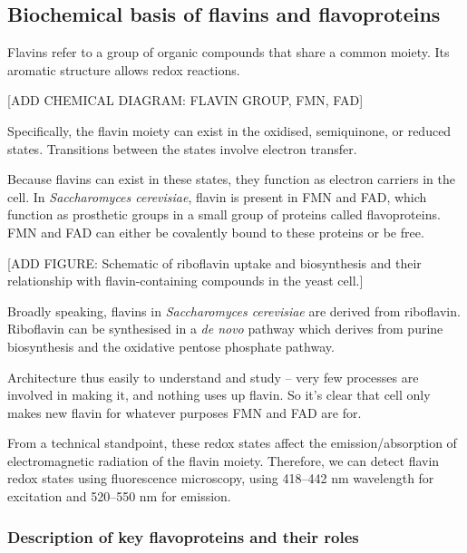 \subsection{Biochemical basis of flavins and flavoproteins}
\label{subsec:intro-flavin-biochem}
Flavins refer to a group of organic compounds that share a common moiety.
Its aromatic structure allows redox reactions.

[ADD CHEMICAL DIAGRAM: FLAVIN GROUP, FMN, FAD]

Specifically, the flavin moiety can exist in the oxidised, semiquinone, or reduced states.
Transitions between the states involve electron transfer.

Because flavins can exist in these states, they function as electron carriers in the cell.
In \emph{Saccharomyces cerevisiae}, flavin is present in FMN and FAD, which function as prosthetic groups in a small group of proteins called flavoproteins.
FMN and FAD can either be covalently bound to these proteins or be free.

[ADD FIGURE: Schematic of riboflavin uptake and biosynthesis and their relationship with flavin-containing compounds in the yeast cell.]

Broadly speaking, flavins in \emph{Saccharomyces cerevisiae} are derived from riboflavin.
Riboflavin can be synthesised in a \emph{de novo} pathway which derives from purine biosynthesis and the oxidative pentose phosphate pathway.

Architecture thus easily to understand and study -- very few processes are involved in making it, and nothing uses up flavin.
So it's clear that cell only makes new flavin for whatever purposes FMN and FAD are for.

From a technical standpoint, these redox states affect the emission/absorption of electromagnetic radiation of the flavin moiety.
Therefore, we can detect flavin redox states using fluorescence microscopy, using 418--442 nm wavelength for excitation and 520--550 nm for emission.

\subsubsection{Description of key flavoproteins and their roles}
\label{subsubsec:intro-flavin-biochem-descriptions}

